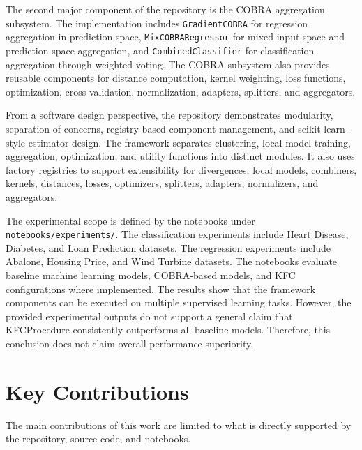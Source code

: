 The second major component of the repository is the COBRA aggregation subsystem. The implementation includes \texttt{GradientCOBRA} for regression aggregation in prediction space, \texttt{MixCOBRARegressor} for mixed input-space and prediction-space aggregation, and \texttt{CombinedClassifier} for classification aggregation through weighted voting. The COBRA subsystem also provides reusable components for distance computation, kernel weighting, loss functions, optimization, cross-validation, normalization, adapters, splitters, and aggregators.

From a software design perspective, the repository demonstrates modularity, separation of concerns, registry-based component management, and scikit-learn-style estimator design. The framework separates clustering, local model training, aggregation, optimization, and utility functions into distinct modules. It also uses factory registries to support extensibility for divergences, local models, combiners, kernels, distances, losses, optimizers, splitters, adapters, normalizers, and aggregators.

The experimental scope is defined by the notebooks under \texttt{notebooks/experiments/}. The classification experiments include Heart Disease, Diabetes, and Loan Prediction datasets. The regression experiments include Abalone, Housing Price, and Wind Turbine datasets. The notebooks evaluate baseline machine learning models, COBRA-based models, and KFC configurations where implemented. The results show that the framework components can be executed on multiple supervised learning tasks. However, the provided experimental outputs do not support a general claim that KFCProcedure consistently outperforms all baseline models. Therefore, this conclusion does not claim overall performance superiority.

\section{Key Contributions}
\label{sec:key_contributions}

The main contributions of this work are limited to what is directly supported by the repository, source code, and notebooks.

